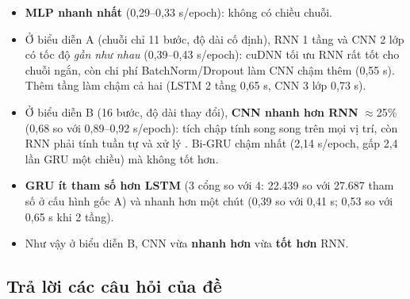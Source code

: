 \begin{itemize}
\item \textbf{MLP nhanh nhất} (0,29--0,33 s/epoch): không có chiều chuỗi.
\item Ở biểu diễn A (chuỗi chỉ 11 bước, độ dài cố định), RNN 1 tầng và CNN 2 lớp có tốc độ \emph{gần như nhau}
  (0,39--0,43 s/epoch): cuDNN tối ưu RNN rất tốt cho chuỗi ngắn, còn chi phí BatchNorm/Dropout làm CNN chậm thêm (0,55 s).
  Thêm tầng làm chậm cả hai (LSTM 2 tầng 0,65 s, CNN 3 lớp 0,73 s).
\item Ở biểu diễn B (16 bước, độ dài thay đổi), \textbf{CNN nhanh hơn RNN} $\approx$25\% (0,68 so với 0,89--0,92 s/epoch):
  tích chập tính song song trên mọi vị trí, còn RNN phải tính tuần tự và xử lý . Bi-GRU chậm nhất
  (2,14 s/epoch, gấp 2,4 lần GRU một chiều) mà không tốt hơn.
\item \textbf{GRU ít tham số hơn LSTM} (3 cổng so với 4: 22.439 so với 27.687 tham số ở cấu hình gốc A) và nhanh hơn một chút
  (0,39 so với 0,41 s; 0,53 so với 0,65 s khi 2 tầng).
\item Như vậy ở biểu diễn B, CNN vừa \textbf{nhanh hơn} vừa \textbf{tốt hơn} RNN.
\end{itemize}

\subsection{Trả lời các câu hỏi của đề}

